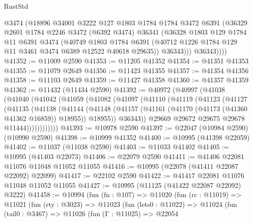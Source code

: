 \begin{lexlean}{RustStd}
\begin{coremodule}
            @3474
            (@18896
              @34001
              @3222
              @127
              @1803
              @1784
              @1784
              @3472
              @6391
              (@36329
                @2601
                @1784
                @2246
                @3472
                (@6392 @3474)
                @36341
                (@36328
                  @1803
                  @129
                  @1784
                  @11
                  @6391
                  @3474
                  (@40749
                    @1803
                    @1784
                    @6391
                    (@40712 @1226 @1784 @129 @11 @3461 @3474 @6389 @12522 @40618 @29635))
                  @36343)))
            @36343))))
@41352 := @11009 @2590
@41353 := @11205 @41352
@41354 := @41351 @41353
@41355 := @11079 @2649
@41356 := @11423 @41355
@41357 := @41354 @41356
@41358 := @11103 @2649
@41359 := @11427 @41358
@41360 := @41357 @41359
@41362 := @11432 (@11434 @2590)
@41392 := @40972
    (@40997
      (@41038
        (@41040
          (@41042
            (@41059
              (@41082
                (@41097
                  (@41110
                    (@41119
                      (@41123
                        (@41127
                          (@41135
                            (@41138
                              (@41144
                                (@41148
                                  (@41157
                                    (@41161 (@41170 (@41173 (@41360 @41362 @16859)) @18955))
                                    @18955))
                                @36343))
                            @29669
                            @29672
                            @29675
                            @29678
                            @11444))))))))))))
@41393 := @10978 @2590
@41397 := @22047 (@10984 @2590) (@10990 @2590)
@41398 := @10999 @41352
@41400 := @10995 (@41398 @22059)
@41402 := @11037 (@11038 @2590)
@41403 := @11033 @41402
@41405 := @10995 (@41403 @22073)
@41406 := @22079 @2590
@41411 := @41406 @22081 @11076 @11048 @11052 @11055
@41416 := @10995 (@22078 (@41411 @22087 @22092) @22099)
@41417 := @22102 @2590
@41422 := @41417 @22081 @11076 @11048 @11052 @11055
@41427 := @10995 (@11125 (@41422 @22087 @22092) @3222)
@41458 := @10994
    (fun (fn : @107) =>
    @11020
      (fun (rc : @11019) =>
      @11021
        (fun (rty : @3023) =>
        @11023
          (fun (lets0 : @11022) =>
          @11024
            (fun (tail0 : @3467) =>
            @11026
              (fun (Γ : @11025) =>
              @22054

\end{coremodule}
\end{lexlean}
